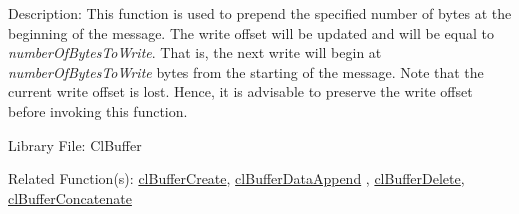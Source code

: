 \begin{Desc}
\item[Description:]This function is used to prepend the specified number of bytes at the beginning of the message. The write offset will be updated and will be equal to {\em number\-Of\-Bytes\-To\-Write\/}. That is, the next write will begin at {\em number\-Of\-Bytes\-To\-Write\/} bytes from the starting of the message. Note that the current write offset is lost. Hence, it is advisable to preserve the write offset before invoking this function.\end{Desc}
\begin{Desc}
\item[Library File:]Cl\-Buffer\end{Desc}
\begin{Desc}
\item[Related Function(s):]\hyperlink{pagebuf103}{cl\-Buffer\-Create}, \hyperlink{pagebuf114}{cl\-Buffer\-Data\-Append} , 
\hyperlink{pagebuf105}{cl\-Buffer\-Delete}, \hyperlink{pagebuf116}{cl\-Buffer\-Concatenate} \end{Desc}


\newpage
